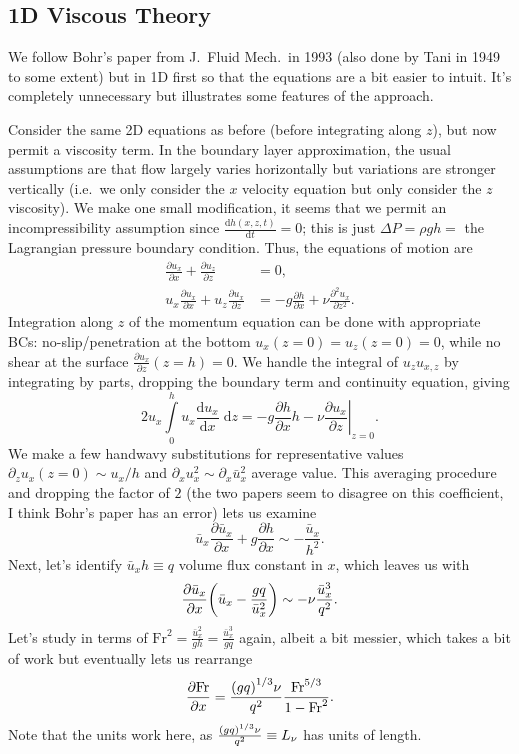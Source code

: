 \documentclass[11pt,
        usenames, %
        dvipsnames %
    ]{report}
\newcommand*{\rd}[2]{\frac{\mathrm{d}#1}{\mathrm{d}#2}}
\newcommand*{\pd}[2]{\frac{\partial#1}{\partial#2}}
\newcommand*{\ptd}[2]{\frac{\partial^2 #1}{\partial#2^2}}
\newcommand*{\at}[1]{\left.#1\right|}
\DeclarePairedDelimiter\p{\lparen}{\rparen}
\begin{document}
\subsection{1D Viscous Theory}

We follow Bohr's paper from J.\ Fluid Mech.\ in 1993 (also done by Tani in 1949
to some extent) but in 1D first so that the equations are a bit easier to
intuit. It's completely unnecessary but illustrates some features of the
approach.

Consider the same 2D equations as before (before integrating along $z$), but now
permit a viscosity term. In the boundary layer approximation, the usual
assumptions are that flow largely varies horizontally but variations are
stronger vertically (i.e.\ we only consider the $x$ velocity equation but only
consider the $z$ viscosity). We make one small modification, it seems that we
permit an incompressibility assumption since $\rd{h(x, z, t)}{t} = 0$; this is
just $\Delta P = \rho g h = $ the Lagrangian pressure boundary condition. Thus,
the equations of motion are
\begin{align}
    \pd{u_x}{x} + \pd{u_z}{z} &= 0,\\
    u_x \pd{u_x}{x} + u_z \pd{u_x}{z} &= -g\pd{h}{x} + \nu \ptd{u_x}{z}.
\end{align}
Integration along $z$ of the momentum equation can be done with appropriate BCs:
no-slip/penetration at the bottom $u_x(z = 0) = u_z(z = 0) = 0$, while no shear
at the surface $\pd{u_x}{z}(z = h) = 0$. We handle the integral of $u_z u_{x,
z}$ by integrating by parts, dropping the boundary term and continuity equation,
giving
\begin{equation}
    2u_x \int\limits_0^h u_x\rd{u_x}{x}\;\mathrm{d}z
        = -g\pd{h}{x}h - \nu\at{\pd{u_x}{z}}_{z = 0}.
\end{equation}
We make a few handwavy substitutions for representative values $\partial_z u_x(z
= 0) \sim u_x / h$ and $\partial_x u_x^2 \sim \partial_x \bar{u}_x^2$ average
value. This averaging procedure and dropping the factor of $2$ (the two papers
seem to disagree on this coefficient, I think Bohr's paper has an error) lets
us examine
\begin{equation}
    \bar{u}_x \pd{\bar{u}_x}{x} + g\pd{h}{x} \sim -\frac{\bar{u}_x}{h^2}.
\end{equation}
Next, let's identify $\bar{u}_xh \equiv q$ volume flux constant in $x$, which
leaves us with
\begin{equation}
    \pd{\bar{u}_x}{x}\p*{\bar{u}_x - \frac{gq}{\bar{u}_x^2}}
        \sim -\nu\frac{\bar{u}_x^3}{q^2}.
\end{equation}
Let's study in terms of $\mathrm{Fr}^2 = \frac{\bar{u}_x^2}{gh} =
\frac{\bar{u}_x^3}{gq}$ again, albeit a bit messier, which takes a bit of work
but eventually lets us rearrange
\begin{equation}
    \pd{\mathrm{Fr}}{x} = \frac{\p*{gq}^{1/3}\nu}{q^2}\frac{
        \mathrm{Fr}^{5/3}}{1 - \mathrm{Fr}^2}.
\end{equation}
Note that the units work here, as $\frac{\p*{gq}^{1/3}\nu}{q^2} \equiv L_\nu$
has units of length.
\end{document}
